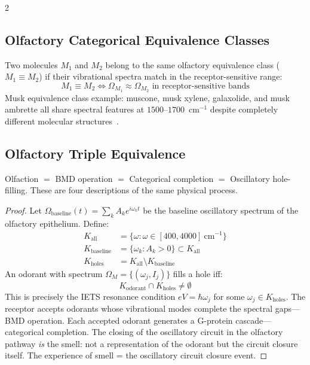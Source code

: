 \begin{multicols}{2}
\subsection{Olfactory Categorical Equivalence Classes}
\label{ssec:olfactory_equiv}

\begin{definition}
\label{def:olf_equiv}
Two molecules $M_1$ and $M_2$ belong to the same olfactory equivalence
class ($M_1 \equiv M_2$) if their vibrational spectra match in the
receptor-sensitive range:
\begin{equation}
M_1 \equiv M_2
  \iff \Omega_{M_1} \approx \Omega_{M_2}
       \text{ in receptor-sensitive bands}
\end{equation}
Musk equivalence class example: muscone, musk xylene, galaxolide, and
musk ambrette all share spectral features at $1500$--$1700$~cm$^{-1}$
despite completely different molecular structures~\citep{keller2004human}.
\end{definition}

\subsection{Olfactory Triple Equivalence}
\label{ssec:olfactory_triple}

\begin{theorem}
\label{thm:olfactory_triple}
Olfaction $=$ BMD operation $=$ Categorical completion $=$ Oscillatory
hole-filling.  These are four descriptions of the same physical process.
\end{theorem}

\begin{proof}
Let $\Omega_{\text{baseline}}(t) = \sum_k A_k e^{i\omega_k t}$ be the
baseline oscillatory spectrum of the olfactory epithelium.  Define:
\begin{align}
K_{\text{all}} &= \{\omega : \omega\in[400,4000]~\text{cm}^{-1}\} \\
K_{\text{baseline}} &= \{\omega_k : A_k > 0\} \subset K_{\text{all}} \\
K_{\text{holes}} &= K_{\text{all}} \setminus K_{\text{baseline}}
\end{align}
An odorant with spectrum $\Omega_M = \{(\omega_j, I_j)\}$ fills a hole iff:
\begin{equation}
K_{\text{odorant}} \cap K_{\text{holes}} \neq \emptyset
\label{eq:hole_fill_condition}
\end{equation}
This is precisely the IETS resonance condition $eV = \hbar\omega_j$ for
some $\omega_j \in K_{\text{holes}}$.  The receptor accepts odorants whose
vibrational modes complete the spectral gaps---BMD operation.  Each
accepted odorant generates a G-protein cascade---categorical completion.
The closing of the oscillatory circuit in the olfactory pathway \emph{is}
the smell: not a representation of the odorant but the circuit closure
itself.  The experience of smell = the oscillatory circuit closure event.


\end{proof}
\end{multicols}
